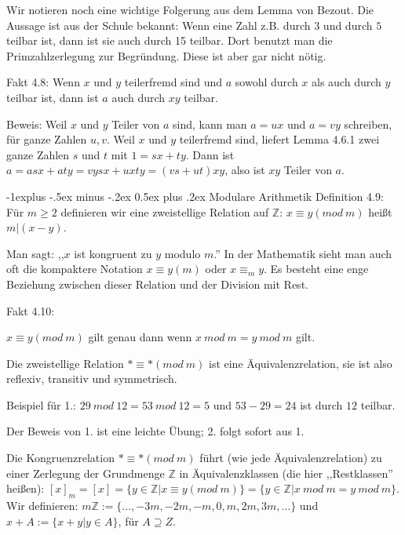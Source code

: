 \documentclass[a4paper]{article}
\makeatletter
\renewcommand{\subsection}{\@startsection{subsection}{2}{0mm}%
 {-1explus -.5ex minus -.2ex}%
 {0.5ex plus .2ex}%
 {\normalfont\normalsize\bfseries}}
\makeatother
\begin{document}
\begin{multicols}{3}
    Wir notieren noch eine wichtige Folgerung aus dem Lemma von Bezout. Die Aussage ist aus der Schule bekannt: Wenn eine Zahl z.B. durch $3$ und durch $5$ teilbar ist, dann ist sie auch durch 15 teilbar. Dort benutzt man die Primzahlzerlegung zur Begründung. Diese ist aber gar nicht nötig.

    Fakt 4.8: Wenn $x$ und $y$ teilerfremd sind und $a$ sowohl durch $x$ als auch durch $y$ teilbar ist, dann ist $a$ auch durch $xy$ teilbar.

    Beweis: Weil $x$ und $y$ Teiler von $a$ sind, kann man $a=ux$ und $a=vy$ schreiben, für ganze Zahlen $u,v$. Weil $x$ und $y$ teilerfremd sind, liefert Lemma 4.6.1 zwei ganze Zahlen $s$ und $t$ mit $1=sx+ty$. Dann ist $a=asx+aty=vysx+uxty= (vs+ut)xy$, also ist $xy$ Teiler von $a$.

    \subsection{Modulare Arithmetik}
    Definition 4.9: Für $m\geq 2$ definieren wir eine zweistellige Relation auf $\mathbb{Z}$: $x\equiv y (mod\ m)$ heißt $m|(x-y)$.

    Man sagt: ,,$x$ ist kongruent zu $y$ modulo $m$.'' In der Mathematik sieht man auch oft die kompaktere Notation $x\equiv y(m)$ oder $x\equiv_m y$. Es besteht eine enge Beziehung zwischen dieser Relation und der Division mit Rest.

    Fakt 4.10:
    \begin{enumerate*}
        \item $x\equiv y(mod\ m)$ gilt genau dann wenn $x\ mod\ m=y\ mod\ m$ gilt.
        \item  Die zweistellige Relation $*\equiv *(mod\ m)$ ist eine Äquivalenzrelation, sie ist also reflexiv, transitiv und symmetrisch.
    \end{enumerate*}

    Beispiel für 1.: $29\ mod\ 12 = 53\ mod\ 12 = 5$ und $53-29 = 24$ ist durch $12$ teilbar.

    Der Beweis von 1. ist eine leichte Übung; 2. folgt sofort aus 1.

    Die Kongruenzrelation $* \equiv  *(mod\ m)$ führt (wie jede Äquivalenzrelation) zu einer Zerlegung der Grundmenge $\mathbb{Z}$ in Äquivalenzklassen (die hier ,,Restklassen'' heißen): $[x]_m= [x] =\{y\in\mathbb{Z}|x\equiv y(mod\ m)\}=\{y\in\mathbb{Z}|x\ mod\ m=y\ mod\ m\}$. Wir definieren: $m\mathbb{Z}:=\{...,-3m,-2m,-m,0,m,2m,3m,...\}$ und $x+A:=\{x+y|y\in A\}$, für $A\supseteq Z$.


\end{multicols}
\end{document}
